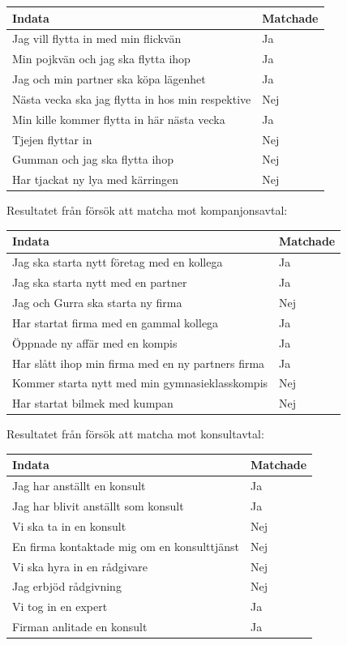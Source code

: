 \documentclass[a4paper,12pt]{article}
\begin{document}
\begin{tabularx}{\textwidth}{ |X|l| } \hline
\textbf{Indata} & \textbf{Matchade}  \\ \hline
Jag vill flytta in med min flickvän & Ja \\ \hline
Min pojkvän och jag ska flytta ihop & Ja \\ \hline
Jag och min partner ska köpa lägenhet & Ja \\ \hline
Nästa vecka ska jag flytta in hos min respektive & Nej \\ \hline
Min kille kommer flytta in här nästa vecka & Ja \\ \hline
Tjejen flyttar in & Nej \\ \hline
Gumman och jag ska flytta ihop  & Nej \\ \hline
Har tjackat ny lya med kärringen  & Nej \\ \hline
\end{tabularx}

Resultatet från försök att matcha mot kompanjonsavtal:

\begin{tabularx}{\textwidth}{ |X|l| } \hline
\textbf{Indata} & \textbf{Matchade}  \\ \hline
Jag ska starta nytt företag med en kollega & Ja \\ \hline
Jag ska starta nytt med en partner & Ja \\ \hline
Jag och Gurra ska starta ny firma & Nej \\ \hline
Har startat firma med en gammal kollega & Ja \\ \hline
Öppnade ny affär med en kompis & Ja \\ \hline
Har slått ihop min firma med en ny partners firma & Ja \\ \hline
Kommer starta nytt med min gymnasieklasskompis & Nej \\ \hline
Har startat bilmek med kumpan & Nej \\ \hline
\end{tabularx}

Resultatet från försök att matcha mot konsultavtal:

\begin{tabularx}{\textwidth}{ |X|l| } \hline
\textbf{Indata} & \textbf{Matchade}  \\ \hline
Jag har anställt en konsult & Ja \\ \hline
Jag har blivit anställt som konsult & Ja \\ \hline
Vi ska ta in en konsult & Nej \\ \hline
En firma kontaktade mig om en konsulttjänst & Nej \\ \hline
Vi ska hyra in en rådgivare & Nej \\ \hline
Jag erbjöd rådgivning & Nej \\ \hline
Vi tog in en expert & Ja \\ \hline
Firman anlitade en konsult & Ja \\ \hline
\end{tabularx}
\end{document}
